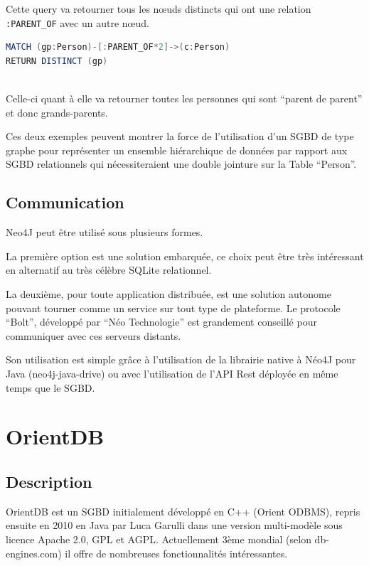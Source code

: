 \documentclass[a4paper,fleqn,12pt,oneside]{report}
\begin{document}
Cette query va retourner tous les nœuds distincts qui ont une relation \texttt{:PARENT\_OF} avec un autre nœud.

\begin{lstlisting}[language=java, frame=single]
MATCH (gp:Person)-[:PARENT_OF*2]->(c:Person) 
RETURN DISTINCT (gp)
	
\end{lstlisting}

Celle-ci quant à elle va retourner toutes les personnes qui sont \enquote{parent de parent} et donc grands-parents. 

Ces deux exemples peuvent montrer la force de l’utilisation d’un SGBD de type graphe pour représenter un ensemble hiérarchique de données par rapport aux SGBD relationnels qui nécessiteraient une double jointure sur la Table \enquote{Person}.

\subsection{Communication}

Neo4J peut être utilisé sous plusieurs formes.

La première option est une solution embarquée, ce choix peut être très intéressant en alternatif au très célèbre SQLite relationnel.

La deuxième, pour toute application distribuée, est une solution autonome pouvant tourner comme un service sur tout type de plateforme. Le protocole \enquote{Bolt}, développé par \enquote{Néo Technologie} est grandement conseillé pour communiquer avec ces serveurs distants.

Son utilisation est simple grâce à l’utilisation de la librairie native à Néo4J pour Java (neo4j-java-drive) ou avec l’utilisation de l’API Rest déployée en même temps que le SGBD.

\section{OrientDB}


\subsection{Description}

OrientDB est un SGBD initialement développé en C++ (Orient ODBMS), repris ensuite en 2010 en Java par Luca Garulli dans une version multi-modèle sous licence Apache 2.0, GPL et AGPL. Actuellement 3ème mondial (selon db-engines.com) il offre de nombreuses fonctionnalités intéressantes.\cite{OrientDBSite}
\end{document}
